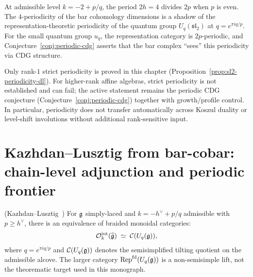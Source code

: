 \begin{remark}
\label{rem:periodicity-quantum}
At admissible level $k = -2 + p/q$, the period $2h = 4$ divides
$2p$ when $p$ is even.  The $4$-periodicity of the bar cohomology
dimensions is a shadow of the representation-theoretic periodicity
of the quantum group $U_q(\mathfrak{sl}_2)$ at
$q = e^{\pi i q/p}$.  For the small quantum group $u_q$, the
representation category is $2p$-periodic, and Conjecture~\ref{conj:periodic-cdg} asserts
that the bar complex ``sees'' this periodicity via CDG structure.
\end{remark}

\begin{remark}
\label{rem:periodicity-scope-boundary-dl}
Only rank-$1$ strict periodicity is proved in this chapter
\textup{(}Proposition~\ref{prop:sl2-periodicity-dl}\textup{)}.
For higher-rank affine algebras, strict periodicity is not established and
can fail; the active statement remains the periodic CDG conjecture
\textup{(}Conjecture~\ref{conj:periodic-cdg}\textup{)} together with
growth/profile control.
In particular, periodicity does not transfer automatically across Koszul
duality or level-shift involutions without additional rank-sensitive input.
\end{remark}



\section{Kazhdan--Lusztig from bar-cobar: chain-level adjunction and periodic frontier}
\label{sec:kl-from-bar-cobar}

\begin{theorem}
\label{thm:kl-equivalence}
\textup{(}Kazhdan--Lusztig~\cite{KL93}\textup{)}\quad
For $\mathfrak{g}$ simply-laced and $k = -h^\vee + p/q$ admissible with
$p \geq h^\vee$, there is an equivalence of braided monoidal
categories:
\begin{equation}\label{eq:kl-equivalence-dl}
\mathcal{O}_k^{\mathrm{int}}(\widehat{\mathfrak{g}})
\;\simeq\;
\mathcal{C}(U_q(\mathfrak{g})),
\end{equation}
where $q = e^{\pi i q/p}$ and $\mathcal{C}(U_q(\mathfrak{g}))$ denotes the
semisimplified tilting quotient on the admissible alcove.  The larger
category $\mathrm{Rep}^{\mathrm{fd}}(U_q(\mathfrak{g}))$ is a non-semisimple
lift, not the theorematic target used in this monograph.
\end{theorem}

